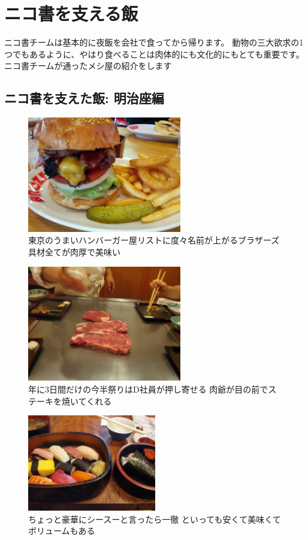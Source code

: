 \section{ニコ書を支える飯}

ニコ書チームは基本的に夜飯を会社で食ってから帰ります。
動物の三大欲求の1つでもあるように、やはり食べることは肉体的にも文化的にもとても重要です。
ニコ書チームが通ったメシ屋の紹介をします

\subsection{ニコ書を支えた飯: 明治座編}

\begin{figure}[H]
  \centering
  \includegraphics[width=0.6\textwidth]{../images/brozers.jpg}
  \caption{東京のうまいハンバーガー屋リストに度々名前が上がるブラザーズ 具材全てが肉厚で美味い}
\end{figure}

\begin{figure}[H]
  \centering
  \includegraphics[width=0.6\textwidth]{../images/imahan.jpg}
  \caption{年に3日間だけの今半祭りはD社員が押し寄せる 肉爺が目の前でステーキを焼いてくれる}
\end{figure}

\begin{figure}[H]
  \centering
  \includegraphics[width=0.5\textwidth]{../images/ittetsu.jpg}
  \caption{ちょっと豪華にシースーと言ったら一徹 といっても安くて美味くてボリュームもある}
\end{figure}

